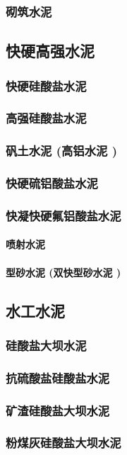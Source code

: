 \documentclass[UTF8]{../../ApplicationUniverse}
\begin{document}
        \subsubsection{砌筑水泥}
    \subsection{快硬高强水泥}
        \subsubsection{快硬硅酸盐水泥}
        \subsubsection{高强硅酸盐水泥}
        \subsubsection{矾土水泥 (高铝水泥 )}
        \subsubsection{快硬硫铝酸盐水泥}
        \subsubsection{快凝快硬氟铝酸盐水泥}
            \paragraph{喷射水泥}
            \paragraph{型砂水泥 (双快型砂水泥 )}
    \subsection{水工水泥}
        \subsubsection{硅酸盐大坝水泥}
        \subsubsection{抗硫酸盐硅酸盐水泥}
        \subsubsection{矿渣硅酸盐大坝水泥}
        \subsubsection{粉煤灰硅酸盐大坝水泥}
\end{document}
